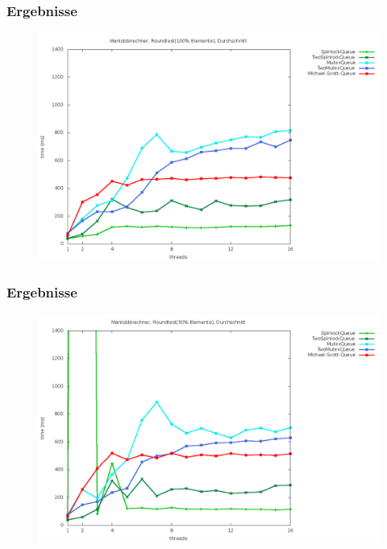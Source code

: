 \documentclass[svgnames]{beamer}
\begin{document}

\begin{frame}
\frametitle{Ergebnisse}
\begin {figure}
      \begin{center}
	\includegraphics[width=\textwidth]{manr2a.png}
     \end{center}
\end {figure}
\end{frame}

\begin{frame}
\frametitle{Ergebnisse}
\begin {figure}
      \begin{center}
	\includegraphics[width=\textwidth]{manr1a.png}
     \end{center}
\end {figure}
\end{frame}
\end{document}
